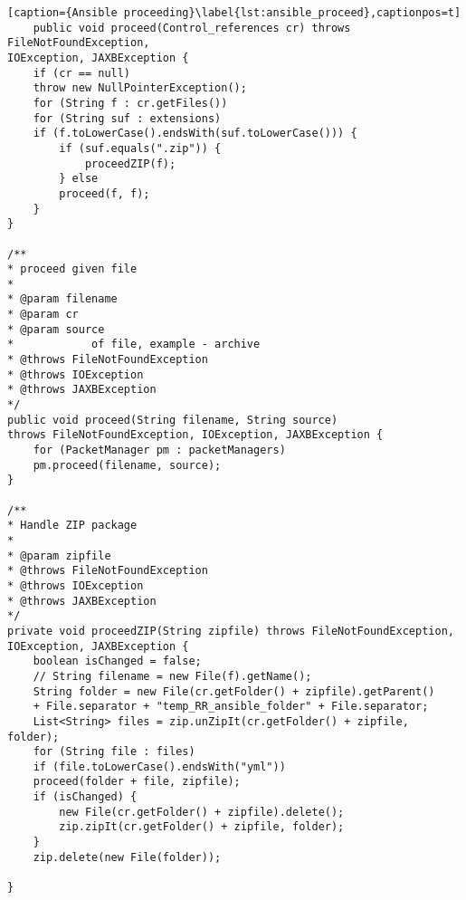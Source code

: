 \begin{lstlisting}[caption={Ansible proceeding}\label{lst:ansible_proceed},captionpos=t] 
	public void proceed(Control_references cr) throws FileNotFoundException,
IOException, JAXBException {
	if (cr == null)
	throw new NullPointerException();
	for (String f : cr.getFiles())
	for (String suf : extensions)
	if (f.toLowerCase().endsWith(suf.toLowerCase())) {
		if (suf.equals(".zip")) {
			proceedZIP(f);
		} else
		proceed(f, f);
	}
}

/**
* proceed given file
* 
* @param filename
* @param cr
* @param source
*            of file, example - archive
* @throws FileNotFoundException
* @throws IOException
* @throws JAXBException
*/
public void proceed(String filename, String source)
throws FileNotFoundException, IOException, JAXBException {
	for (PacketManager pm : packetManagers)
	pm.proceed(filename, source);
}

/**
* Handle ZIP package
* 
* @param zipfile
* @throws FileNotFoundException
* @throws IOException
* @throws JAXBException
*/
private void proceedZIP(String zipfile) throws FileNotFoundException,
IOException, JAXBException {
	boolean isChanged = false;
	// String filename = new File(f).getName();
	String folder = new File(cr.getFolder() + zipfile).getParent()
	+ File.separator + "temp_RR_ansible_folder" + File.separator;
	List<String> files = zip.unZipIt(cr.getFolder() + zipfile, folder);
	for (String file : files)
	if (file.toLowerCase().endsWith("yml"))
	proceed(folder + file, zipfile);
	if (isChanged) {
		new File(cr.getFolder() + zipfile).delete();
		zip.zipIt(cr.getFolder() + zipfile, folder);
	}
	zip.delete(new File(folder));
	
}
\end{lstlisting}